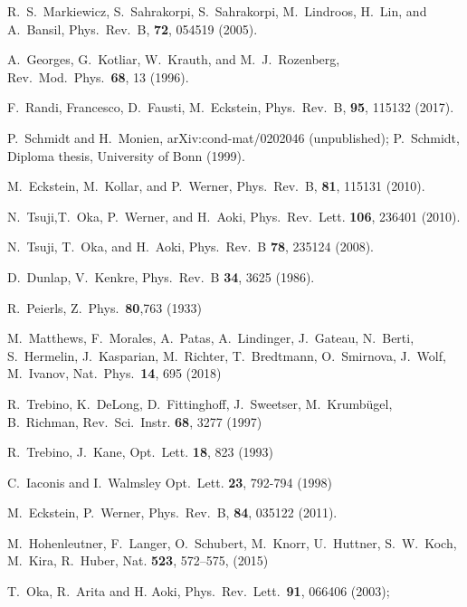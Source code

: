 \documentclass[prb,aps,twocolumn,showpacs,amsmath,amssymb]{revtex4}%
\begin{document}
\begin{thebibliography}{99}
R.\  S.\ Markiewicz, S.\ Sahrakorpi, S.\ Sahrakorpi, M.\ Lindroos, H.\ Lin, and A.\ Bansil,
    Phys.\ Rev.\ B, {\bf 72}, 054519 (2005).

%
    A.\ Georges, G.\ Kotliar, W.\ Krauth, and M.\ J.\ Rozenberg,
    Rev.\ Mod.\ Phys.\ {\bf 68}, 13 (1996).


  F.\ Randi, Francesco, D.\ Fausti, M.\ Eckstein,
  Phys.\ Rev.\ B, {\bf 95}, 115132 (2017).

    P.\ Schmidt and H.\ Monien,
    arXiv:cond-mat/0202046 (unpublished);
    P.\ Schmidt,
    Diploma thesis, University of Bonn (1999).

    M.\ Eckstein, M.\ Kollar, and P.\ Werner,
    Phys.\ Rev.\ B, {\bf 81}, 115131 (2010).
    
    N.\ Tsuji,T.\ Oka, P.\ Werner, and H.\ Aoki,
  Phys.\ Rev.\ Lett. {\bf 106}, 236401 (2010).

   N.\ Tsuji, T.\ Oka, and H.\ Aoki, 
   Phys.\ Rev.\ B {\bf 78}, 235124 (2008).


   D.\ Dunlap, V.\ Kenkre, 
   Phys.\ Rev.\ B {\bf 34}, 3625 (1986).

  R.\ Peierls, 
  Z.\ Phys.\ {\bf 80},763 (1933)

  M.\ Matthews, F.\ Morales, A.\ Patas, A.\ Lindinger, J.\ Gateau,  N.\ Berti, S.\ Hermelin, J.\ Kasparian, M.\ Richter, T.\ Bredtmann,  O.\ Smirnova, J.\ Wolf, M.\ Ivanov,
  Nat.\ Phys.\ {\bf 14}, 695 (2018) 

   R.\ Trebino, K.\ DeLong, D.\ Fittinghoff, J.\ Sweetser, M.\ Krumbügel, B.\ Richman,
   Rev.\ Sci.\ Instr. {\bf 68}, 3277 (1997)
   
   R.\ Trebino, J.\ Kane,
   Opt.\ Lett. {\bf 18}, 823 (1993)
  
  C.\ Iaconis and I.\ Walmsley 
  Opt.\ Lett. {\bf 23}, 792-794 (1998)
 
 
    M.\ Eckstein, P.\ Werner,
    Phys.\ Rev.\ B, {\bf 84}, 035122 (2011).


  M.\ Hohenleutner, F.\ Langer, O.\ Schubert, M.\ Knorr, U.\ Huttner, S.\ W.\ Koch, M.\ Kira, R.\ Huber,
  Nat. {\bf 523}, 572–575, (2015)

T.\ Oka, R.\ Arita and H. Aoki, 
Phys.\ Rev.\ Lett.\ {\bf 91}, 066406 (2003); 


\end{thebibliography}
\end{document}
